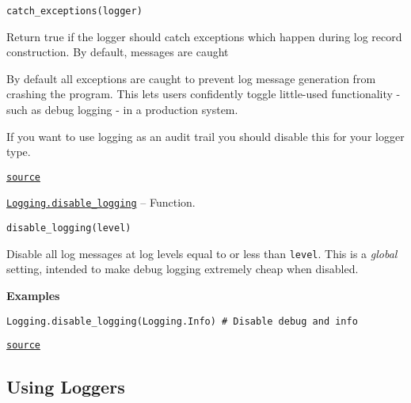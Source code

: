 \begin{adjustwidth}{2em}{0pt}


\begin{verbatim}
catch_exceptions(logger)
\end{verbatim}

Return true if the logger should catch exceptions which happen during log record construction.  By default, messages are caught

By default all exceptions are caught to prevent log message generation from crashing the program.  This lets users confidently toggle little-used functionality - such as debug logging - in a production system.

If you want to use logging as an audit trail you should disable this for your logger type.



\href{https://github.com/JuliaLang/julia/blob/9058264a69f9efc1af805c4473c946f87859b731/base/logging.jl#L58-L70}{\texttt{source}}


\end{adjustwidth}
\hypertarget{10677278458507378523}{}
\hyperlink{10677278458507378523}{\texttt{Logging.disable\_logging}}  -- {Function.}

\begin{adjustwidth}{2em}{0pt}


\begin{verbatim}
disable_logging(level)
\end{verbatim}

Disable all log messages at log levels equal to or less than \texttt{level}.  This is a \emph{global} setting, intended to make debug logging extremely cheap when disabled.

\textbf{Examples}


\begin{verbatim}
Logging.disable_logging(Logging.Info) # Disable debug and info
\end{verbatim}



\href{https://github.com/JuliaLang/julia/blob/9058264a69f9efc1af805c4473c946f87859b731/base/logging.jl#L500-L511}{\texttt{source}}


\end{adjustwidth}

\hypertarget{14824596935687234191}{}


\subsection{Using Loggers}




